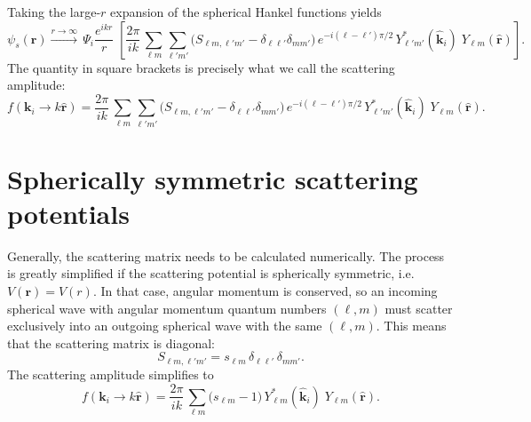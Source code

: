 \documentclass[pra,12pt]{revtex4}
\begin{document}
Taking the large-$r$ expansion of the spherical Hankel functions yields
$$\psi_s(\mathbf{r}) \overset{r\rightarrow\infty}{\longrightarrow} \, \Psi_i \frac{e^{ikr}}{r} \; \left[ \frac{2 \pi}{ik}\, \sum_{\ell m} \sum_{\ell' m'} \Big(S_{\ell m, \ell' m'} - \delta_{\ell \ell'}\delta_{mm'}\Big) \, e^{-i(\ell-\ell')\pi/2} \, Y_{\ell' m'}^*(\hat{\mathbf{k}}_i)\; Y_{\ell m}(\hat{\mathbf{r}})\right].$$
The quantity in square brackets is precisely what we call the
scattering amplitude:
$$f(\mathbf{k}_i \rightarrow k\hat{\mathbf{r}}) =  \frac{2 \pi}{ik}\, \sum_{\ell m} \sum_{\ell' m'} \Big(S_{\ell m, \ell' m'} - \delta_{\ell \ell'}\delta_{mm'}\Big) \, e^{-i(\ell-\ell')\pi/2} \, Y_{\ell' m'}^*(\hat{\mathbf{k}}_i)\; Y_{\ell m}(\hat{\mathbf{r}}).$$

\section{Spherically symmetric scattering potentials}

Generally, the scattering matrix needs to be calculated numerically.
The process is greatly simplified if the scattering potential is
spherically symmetric, i.e.~$V(\mathbf{r}) = V(r)$.  In that case,
angular momentum is conserved, so an incoming spherical wave with
angular momentum quantum numbers $(\ell,m)$ must scatter exclusively
into an outgoing spherical wave with the same $(\ell,m)$.  This means
that the scattering matrix is diagonal:
$$S_{\ell m, \ell'm'} = s_{\ell m}\, \delta_{\ell\ell'}\, \delta_{mm'}.$$
The scattering amplitude simplifies to
$$f(\mathbf{k}_i \rightarrow k\hat{\mathbf{r}}) =  \frac{2 \pi}{ik}\, \sum_{\ell m} \Big(s_{\ell m} - 1\Big) \, Y_{\ell m}^*(\hat{\mathbf{k}}_i)\; Y_{\ell m}(\hat{\mathbf{r}}).$$
\end{document}
